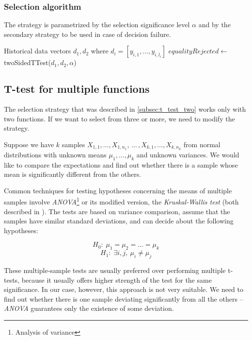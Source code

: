 \subsubsection{Selection algorithm}

The strategy is parametrized by the selection significance level $\alpha$ and by the secondary strategy to be used in case of decision failure.

\begin{algorithmic}[1] %
	\INPUT Historical data vectors $d_1,d_2$ where $d_i = [y_{i,1},\dots, y_{i,l_i}]$
	\State $equalityRejected \gets$ twoSidedTTest($d_1, d_2, \alpha$)
	\State {}
	\EndIf
	\State {}
	\Else 
	\State {}
	\EndIf
\end{algorithmic}

\subsection{T-test for multiple functions}
\label{subsec:t_test_multiple}

The selection strategy that was described in \ref{subsec:t_test_two} works only with two functions. If we want to select from three or more, we need to modify the strategy.

Suppose we have $k$ samples $X_{1,1}, \dots, X_{1, n_1}, \, \dots \, , X_{k,1}, \dots, X_{k, n_k}$ from normal distributions with unknown means $\mu_1, \dots, \mu_k$ and unknown variances. We would like to compare the expectations and find out whether there is a sample whose mean is significantly different from the others.

Common techniques for testing hypotheses concerning the means of multiple samples involve \textit{ANOVA}\footnote{Analysis of variance} or its modified version, the \textit{Kruskal-Wallis test} (both described in \cite{weiss_introductory_2010}). The tests are based on variance comparison, assume that the samples have similar standard deviations, and can decide about the following hypotheses:

\[
H_0: \; \mu_1 = \mu_2 = \dots = \mu_k
\]
\[
H_1: \; \exists i, j, \ \mu_i \neq \mu_j
\]

These multiple-sample tests are usually preferred over performing multiple \mbox{t-tests}, because it usually offers higher strength of the test for the same significance. In our case, however, this approach is not very suitable. We need to find out whether there is one sample deviating significantly from all the others -- \textit{ANOVA} guarantees only the existence of some deviation.

